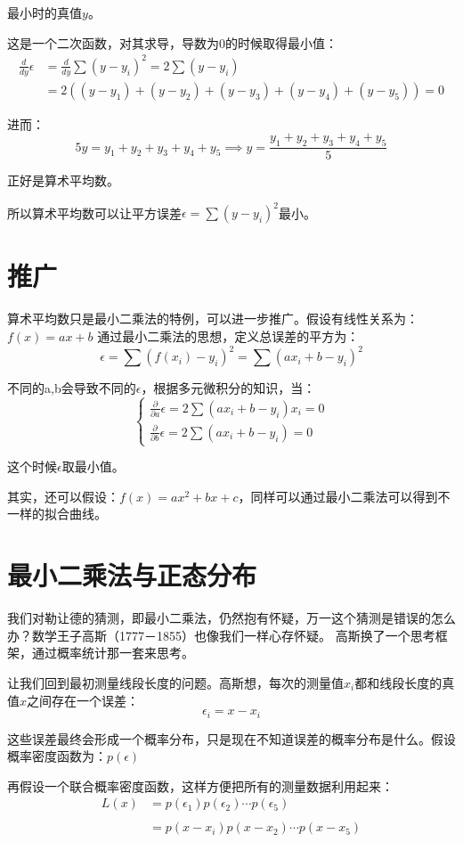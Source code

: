 \documentclass[12pt]{article}
\begin{document}
最小时的真值$y$。

这是一个二次函数，对其求导，导数为0的时候取得最小值：
\begin{align}
    \frac{d}{dy}\epsilon
        &= \frac{d}{dy}\sum (y-y_i)^2=2\sum (y-y_i) \\
        &= 2((y-y_1)+(y-y_2)+(y-y_3)+(y-y_4)+(y-y_5))=0
\end{align}

进而：
$$
    5y=y_1+y_2+y_3+y_4+y_5\implies y=\frac{y_1+y_2+y_3+y_4+y_5}{5}
$$

正好是算术平均数。

所以算术平均数可以让平方误差$\epsilon=\sum (y-y_i)^2$最小。


\section{推广}
算术平均数只是最小二乘法的特例，可以进一步推广。假设有线性关系为：$f(x)=ax+b$ 通过最小二乘法的思想，定义总误差的平方为：
$$
\epsilon=\sum (f(x_i)-y_i)^2=\sum (ax_i+b-y_i)^2
$$

不同的a,b会导致不同的$\epsilon$，根据多元微积分的知识，当：
$$
\begin{cases}
    \frac{\partial}{\partial a}\epsilon=2\sum (ax_i+b-y_i)x_i=0\\
    \frac{\partial}{\partial b}\epsilon=2\sum (ax_i+b-y_i)=0
\end{cases}
$$

这个时候$\epsilon$取最小值。

其实，还可以假设：$f(x)=ax^2+bx+c$，同样可以通过最小二乘法可以得到不一样的拟合曲线。

\section{最小二乘法与正态分布}
我们对勒让德的猜测，即最小二乘法，仍然抱有怀疑，万一这个猜测是错误的怎么办？数学王子高斯（1777－1855）也像我们一样心存怀疑。
高斯换了一个思考框架，通过概率统计那一套来思考。

让我们回到最初测量线段长度的问题。高斯想，每次的测量值$x_i$都和线段长度的真值$x$之间存在一个误差：
$$
\epsilon_i=x-x_i
$$

这些误差最终会形成一个概率分布，只是现在不知道误差的概率分布是什么。假设概率密度函数为：$p(\epsilon)$

再假设一个联合概率密度函数，这样方便把所有的测量数据利用起来：
\begin{align}
    L(x)
        &=p(\epsilon_1)p(\epsilon_2)\cdots p(\epsilon_5)\\
        \quad\\
        &=p(x-x_i)p(x-x_2)\cdots p(x-x_5)
\end{align}
\end{document}
